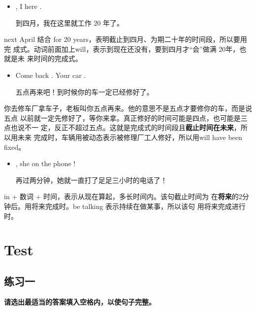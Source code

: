 \begin{itemize}
\item  {}, I  here .

  到四月，我在这里就工作 20 年了。
\end{itemize}

next April 结合 for 20 years，表明截止到四月、为期二十年的时间段，所以要用完
成式。动词前面加上will，表示到现在还没有，要到四月才“会”做满 20年，也就是未
来时间的完成式。

\begin{itemize}
\item  Come back . Your car  .

  五点再来吧！到时候你的车一定已经修好了。
\end{itemize}

你去修车厂拿车子，老板叫你五点再来。他的意思不是五点才要修你的车，而是说五点
以前就一定先修好了，等你来拿。真正修好的时间可能是四点，也可能是三点也说不一
定，反正不超过五点。这就是完成式的时间段且\textbf{截止时间在未来}，所以用未来
完成时，车辆用被动态表示被修理厂工人修好，所以用will have been fixed。

\begin{itemize}
\item {}, she  on the
  phone !

  再过两分钟，她就一直打了足足三小时的电话了！
\end{itemize}

in + 数词 + 时间，表示从现在算起，多长时间内。该句截止时间为
在\textbf{将来}的2分钟后。用将来完成时。be talking 表示持续在做某事，所以该句
用将来完成进行时。

\section{Test}

\subsection{练习一}

\textbf{请选出最适当的答案填入空格内，以使句子完整。}

